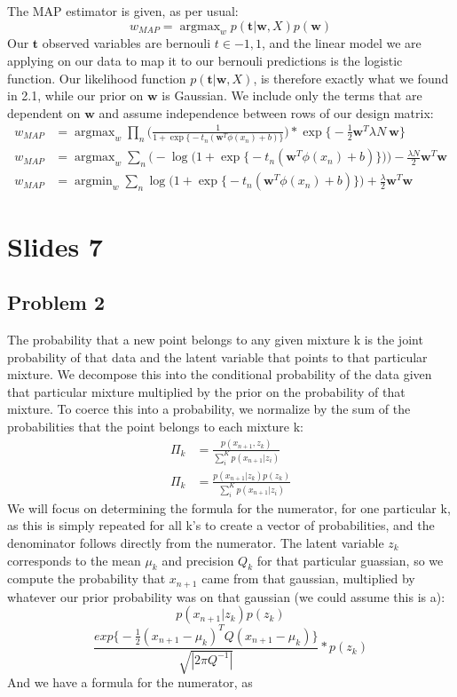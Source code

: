 \documentclass[a4paper,12pt]{article}
\DeclareMathOperator*{\argmin}{argmin}
\DeclareMathOperator*{\argmax}{argmax}
\begin{document}
The MAP estimator is given, as per usual:
%
$$
w_{MAP} = \argmax_w p( \bm{t} | \bm{w}, X)p(\bm{w})
$$
%
Our $\bm{t}$ observed variables are bernouli $t \in {-1,1}$, and the linear model we are applying on our data to map it to our bernouli predictions is the logistic function. Our likelihood function $ p( \bm{t} | \bm{w}, X) $, is therefore exactly what we found in 2.1, while our prior on $\bm{w}$ is Gaussian. We include only the terms that are dependent on $\bm{w}$ and assume independence between rows of our design matrix:
%
\begin{align*}
w_{MAP} &= \argmax_w \prod_n \Bigg( \frac{1}{1 + \exp\Big\{ -t_n(\bm{w}^T{\phi}(x_n) + b)  \Big\} } \Bigg) * \exp \Big\{ -\frac{1}{2}\bm{w}^T \lambda N\ \bm{w} \Big\} \\
w_{MAP} &= \argmax_w \sum_n \Big( - \log \Big( 1 + \exp\Big\{  -t_n(\bm{w}^T{\phi}(x_n) + b)  \Big\} \Big)\Big) - \frac{\lambda N}{2}\bm{w}^T \bm{w} \\
w_{MAP} &= \argmin_w \sum_n \log \Big( 1 + \exp\Big\{ -t_n(\bm{w}^T{\phi}(x_n) + b)  \Big\} \Big) + \frac{\lambda }{2} \bm{w}^T \bm{w}
\end{align*}
%

\section*{Slides 7}

\subsection*{Problem 2}

The probability that a new point belongs to any given mixture k is the joint probability of that data and the latent variable that points to that particular mixture. We decompose this into the conditional probability of the data given that particular mixture multiplied by the prior on the probability of that mixture. To coerce this into a probability, we normalize by the sum of the probabilities that the point belongs to each mixture k:
%
\begin{align*}
\Pi_k &= \frac{p(x_{n+1}, z_k)}{\sum_i^K p(x_{n+1} | z_i)} \\
\Pi_k &= \frac{p(x_{n+1} | z_k)p(z_k)}{\sum_i^K p(x_{n+1} | z_i)}
\end{align*}
%
We will focus on determining the formula for the numerator, for one particular k, as this is simply repeated for all k's to create a vector of probabilities, and the denominator follows directly from the numerator. The latent variable $z_k$ corresponds to the mean $\mu_k$ and precision $Q_k$ for that particular guassian, so we compute the probability that $x_{n+1}$ came from that gaussian, multiplied by whatever our prior probability was on that gaussian (we could assume this is a):
%
$$
p(x_{n+1} | z_k)p(z_k)
$$
$$
\frac{exp \Big\{ -\frac{1}{2} (x_{n+1} - \mu_k)^T Q (x_{n+1} - \mu_k) \Big\} }{\sqrt{|2\pi Q^{-1}|}} * p(z_k)
$$
%
And we have a formula for the numerator, as
\end{document}
